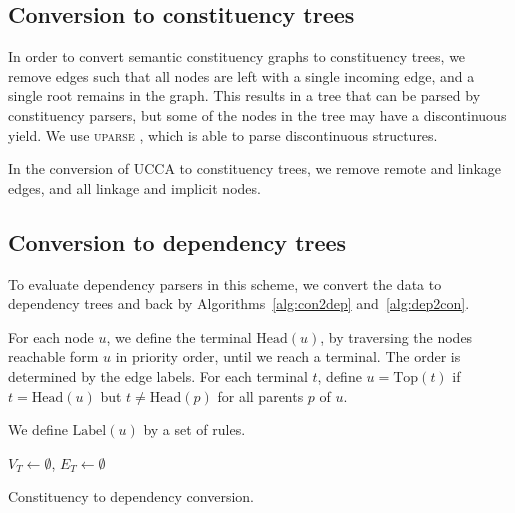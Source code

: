 \documentclass[11pt]{article}
\begin{document}
\subsection{Conversion to constituency trees}

In order to convert semantic constituency graphs to constituency trees, we remove edges such that all nodes are left with a single incoming edge, and a single root remains in the graph. This results in a tree that can be parsed by constituency parsers, but some of the nodes in the tree may have a discontinuous yield. We use \textsc{uparse} \cite{maier2015discontinuous}, which is able to parse discontinuous structures.

In the conversion of UCCA to constituency trees, we remove remote and linkage edges, and all linkage and implicit nodes.


\subsection{Conversion to dependency trees}
\label{subsec:con2dep}

To evaluate dependency parsers in this scheme, we convert the data to dependency trees and back by Algorithms~\ref{alg:con2dep} and~\ref{alg:dep2con}.

For each node $u$, we define the terminal $\mathrm{Head}(u)$, by traversing the nodes reachable form $u$ in priority order, until we reach a terminal. The order is determined by the edge labels. For each terminal $t$, define $u=\mathrm{Top}(t)$ if $t=\mathrm{Head}(u)$ but $t\neq \mathrm{Head}(p)$ for all parents $p$ of $u$.

We define $\mathrm{Label}(u)$ by a set of rules.

\begin{algorithm}[t]
 $V_T \leftarrow \emptyset$,
 $E_T \leftarrow \emptyset$\\
 \caption{Constituency to dependency conversion.}
 \label{alg:con2dep}
\end{algorithm}
\end{document}
